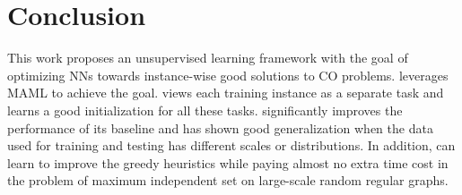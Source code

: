 
\section{Conclusion}
This work proposes an unsupervised learning framework \proj with the goal of optimizing NNs towards instance-wise good solutions to CO problems. \proj leverages MAML to achieve the goal. \proj views each training instance as a separate task and learns a good initialization for all these tasks. \proj significantly improves the performance of its baseline and has shown good generalization when the data used for training and testing has different scales or distributions.  In addition, \proj can learn to improve the greedy heuristics while paying almost no extra time cost in the problem of maximum independent set on large-scale random regular graphs. 









